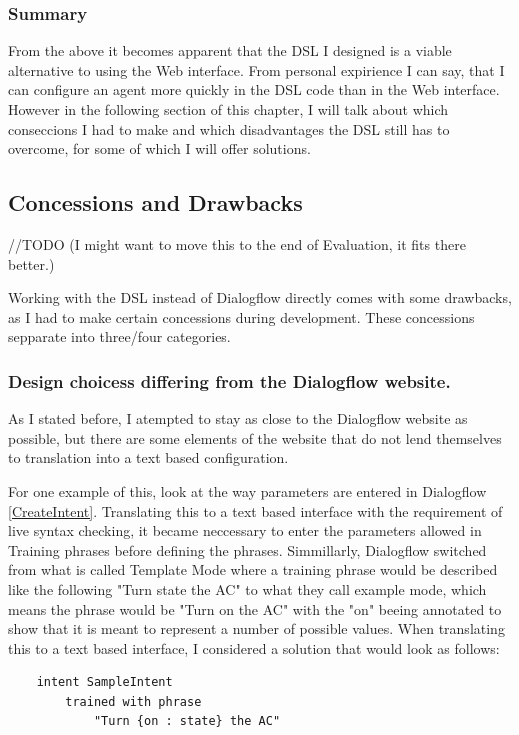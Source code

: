 \subsubsection{Summary}
From the above it becomes apparent that the DSL I designed is a viable alternative to using the Web interface.
From personal expirience I can say, that I can configure an agent more quickly in the DSL code than in the Web interface. However in the following section of this chapter, I will talk about which conseccions I had to make and which disadvantages the DSL still has to overcome, for some of which I will offer solutions.

\subsection{Concessions and Drawbacks}
//TODO (I might want to move this to the end of Evaluation, it fits there better.)

Working with the DSL instead of Dialogflow directly comes with some drawbacks, as I had to make certain concessions during development. 
These concessions sepparate into three/four categories.

\subsubsection{Design choicess differing from the Dialogflow website.}
As I stated before, I atempted to stay as close to the Dialogflow website as possible, but there are some elements of the website that do not lend themselves to translation into a text based configuration.

For one example of this, look at the way parameters are entered in Dialogflow \autoref{CreateIntent}. Translating this to a text based interface with the requirement of live syntax checking, it became neccessary to enter the parameters allowed in Training phrases before defining the phrases.
Simmillarly, Dialogflow switched from what is called Template Mode where a training phrase would be described like the following "Turn state the AC" to what they call example mode, which means the phrase would be "Turn on the AC" with the "on" beeing annotated to show that it is meant to represent a number of possible values.
When translating this to a text based interface, I considered a solution that would look as follows:

\begin{verbatim}
    intent SampleIntent
        trained with phrase
            "Turn {on : state} the AC"
\end{verbatim}

